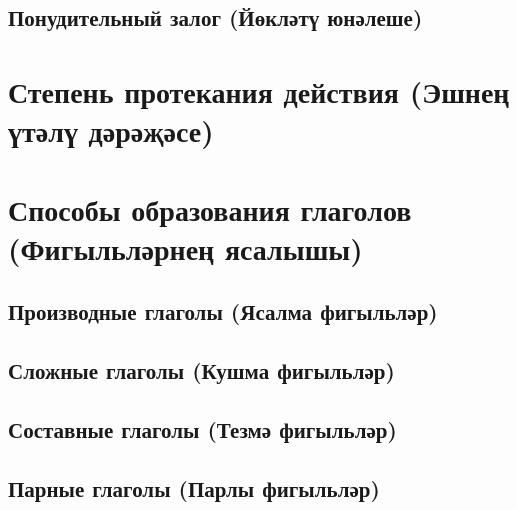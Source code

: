 \subsection{Понудительный залог (Йөкләтү юнәлеше)}
\section{Степень протекания действия (Эшнең үтәлү дәрәҗәсе)}
\section{Способы образования глаголов (Фигыльләрнең ясалышы)}
\subsection{Производные глаголы (Ясалма фигыльләр)}
\subsection{Сложные глаголы (Кушма фигыльләр)}
\subsection{Составные глаголы (Тезмә фигыльләр)}
\subsection{Парные глаголы (Парлы фигыльләр)}\



